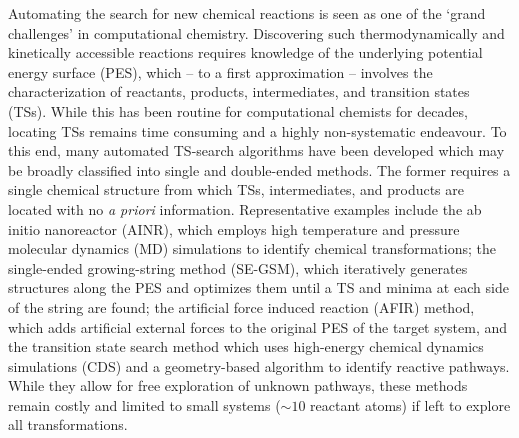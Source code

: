 \documentclass[../../main.tex]{subfiles}
\begin{document}
Automating the search for new chemical reactions is seen as one of the ‘grand challenges’ in computational chemistry.\cite{Grimme2018, Foscato2020} Discovering such thermodynamically and kinetically accessible reactions requires knowledge of the underlying potential energy surface (PES), which -- to a first approximation -- involves the characterization of reactants, products, intermediates, and transition states (TSs).\cite{Cheng2015, Sameera2012, Kozuch2011} While this has been routine for computational chemists for decades, locating TSs remains time consuming and a highly non-systematic endeavour.\cite{Simm2019} To this end, many automated TS-search algorithms have been developed which may be broadly classified into single and double-ended methods.\cite{Jensen2020, Dewyer2018} The former requires a single chemical structure from which TSs, intermediates, and products are located with no \emph{a priori} information. Representative examples include the ab initio nanoreactor (AINR),\cite{Wang2014} which employs high temperature and pressure molecular dynamics (MD) simulations to identify chemical transformations; the single-ended growing-string method (SE-GSM),\cite{Zimmerman2015} which iteratively generates structures along the PES and optimizes them until a TS and minima at each side of the string are found; the artificial force induced reaction (AFIR) method,\cite{Maeda2016} which adds artificial external forces to the original PES of the target system, and the transition state search method which uses high-energy chemical dynamics simulations (CDS) and a geometry-based algorithm to identify reactive pathways.\cite{Martinez-Nunez2015} While they allow for free exploration of unknown pathways, these methods remain costly and limited to small systems ($\sim10$ reactant atoms) if left to explore all transformations.
\\\\
\end{document}
